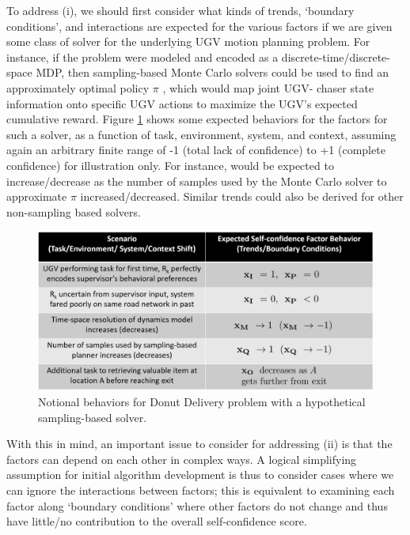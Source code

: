 To address (i), we should first consider what kinds of trends, `boundary conditions', and interactions are expected for the various factors if we are given some class of solver for the underlying UGV motion planning problem. For instance, if the problem were modeled and encoded as a discrete-time/discrete-space MDP, then sampling-based Monte Carlo solvers could be used to find an approximately optimal policy $\pi$ \cite{Browne2012-lj}, which would map joint UGV- chaser state information onto specific UGV actions to maximize the UGV's expected cumulative reward. Figure \ref{fig:trendsBCs} shows some expected behaviors for the \famsec{} factors for such a solver, as a function of task, environment, system, and context, assuming again an arbitrary finite range of -1 (total lack of confidence) to +1 (complete confidence) for illustration only. For instance, \xQ{} would be expected to increase/decrease as the number of samples used by the Monte Carlo solver to approximate $\pi$ increased/decreased. Similar trends could also be derived for other non-sampling based solvers.  %
\begin{figure}[tbp]
    \centering
    \includegraphics[width=0.8\linewidth]{Figures/scTrendsBoundaryExample.png}
    \caption{Notional \famsec{} behaviors for Donut Delivery problem with a hypothetical sampling-based solver.}
    \label{fig:trendsBCs}
\end{figure}

With this in mind, an important issue to consider for addressing (ii) is that the factors can depend on each other in complex ways. A logical simplifying assumption for initial algorithm development is thus to consider cases where we can ignore the interactions between factors; this is equivalent to examining each factor along `boundary conditions' where other factors do not change and thus have little/no contribution to the overall self-confidence score. 

